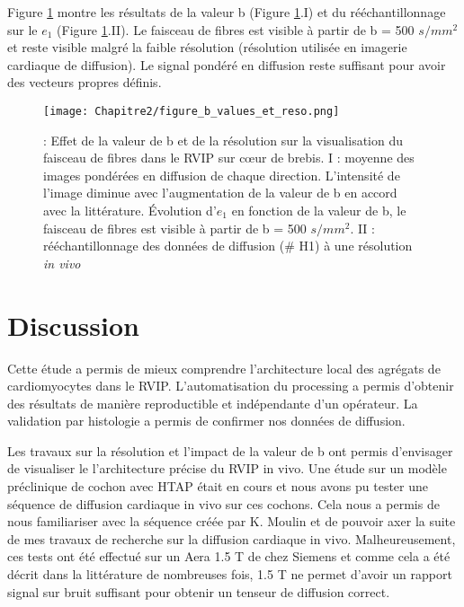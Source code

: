 Figure \ref{fig:diff_reso} montre les résultats de la valeur b (Figure \ref{fig:diff_reso}.I) et du rééchantillonnage sur le $e_1$ (Figure \ref{fig:diff_reso}.II). Le faisceau de fibres est visible à partir de b = 500 $s/mm^2$ et reste visible malgré la faible résolution (résolution utilisée en imagerie cardiaque de diffusion). Le signal pondéré en diffusion reste suffisant pour avoir des vecteurs propres définis.

\begin{figure}[!ht]
  \begin{center}
    \texttt{[image: Chapitre2/figure\_b\_values\_et\_reso.png]}
  \end{center}
  \caption{: Effet de la valeur de b et de la résolution sur la visualisation du faisceau de fibres dans le RVIP sur cœur de brebis. I : moyenne des images pondérées en diffusion de chaque direction. L’intensité de l’image diminue avec l’augmentation de la valeur de b en accord avec la littérature. Évolution d’$e_1$ en fonction de la valeur de b, le faisceau de fibres est visible à partir de b = 500  $s/mm^2$. II : rééchantillonnage des données de diffusion ($\#$ H1) à une résolution \textit{in vivo}}
  \label{fig:diff_reso}
\end{figure}
%
\clearpage
\section{Discussion}

Cette étude a permis de mieux comprendre l’architecture local des agrégats de cardiomyocytes dans le RVIP. L’automatisation du processing a permis d’obtenir des résultats de manière reproductible et indépendante d’un opérateur. La validation par histologie a permis de confirmer nos données de diffusion. 

Les travaux sur la résolution et l’impact de la valeur de b ont permis d’envisager de visualiser le l’architecture précise du RVIP in vivo. Une étude sur un modèle préclinique de cochon avec HTAP était en cours et nous avons pu tester une séquence de diffusion cardiaque in vivo sur ces cochons. Cela nous a permis de nous familiariser avec la séquence créée par K. Moulin et de pouvoir axer la suite de mes travaux de recherche sur la diffusion cardiaque in vivo. Malheureusement, ces tests ont été effectué sur un Aera 1.5 T de chez Siemens et comme cela a été décrit dans la littérature de nombreuses fois, 1.5 T ne permet d’avoir un rapport signal sur bruit suffisant pour obtenir un tenseur de diffusion correct.  

